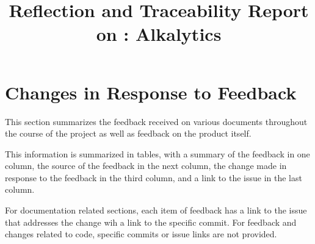 \documentclass{article}
\title{Reflection and Traceability Report on \progname: Alkalytics}
\author{\authname}
\date{}
\begin{document}
\maketitle


\section{Changes in Response to Feedback}
This section summarizes the feedback received on various documents throughout
the course of the project as well as feedback on the product itself.

This information is summarized in tables, with a summary of the feedback in one
column, the source of the feedback in the next column, the change made in
response to the feedback in the third column, and a link to the issue in the
last column. 

For documentation related sections, each item of feedback has a
link to the issue that addresses the change wih a link to the specific commit.
For feedback and changes related to code, specific commits or issue links are
not provided.



\end{document}
